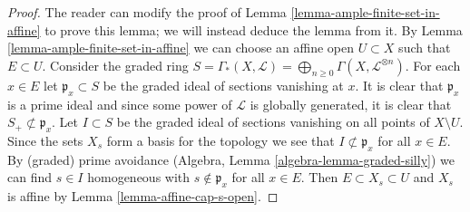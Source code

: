 \begin{proof}
The reader can modify the proof of Lemma \ref{lemma-ample-finite-set-in-affine}
to prove this lemma; we will instead deduce the lemma from it.
By Lemma \ref{lemma-ample-finite-set-in-affine} we can choose an affine
open $U \subset X$ such that $E \subset U$.
Consider the graded ring $S = \Gamma_*(X, \mathcal{L}) =
\bigoplus_{n \geq 0} \Gamma(X, \mathcal{L}^{\otimes n})$.
For each $x \in E$ let $\mathfrak p_x \subset S$ be the graded ideal
of sections vanishing at $x$. It is clear that $\mathfrak p_x$ is
a prime ideal and since some power of $\mathcal{L}$ is globally
generated, it is clear that $S_{+} \not \subset \mathfrak p_x$.
Let $I \subset S$ be the graded ideal of sections vanishing on all
points of $X \setminus U$. Since the sets $X_s$ form a basis
for the topology we see that $I \not \subset \mathfrak p_x$ for
all $x \in E$.
By (graded) prime avoidance (Algebra, Lemma \ref{algebra-lemma-graded-silly})
we can find $s \in I$ homogeneous
with $s \not \in \mathfrak p_x$ for all $x \in E$.
Then $E \subset X_s \subset U$ and $X_s$ is affine by
Lemma \ref{lemma-affine-cap-s-open}.
\end{proof}

















